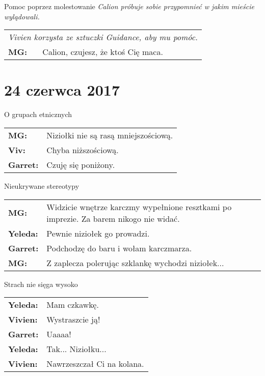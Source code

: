 \documentclass[10pt,twoside,twocolumn]{book}
\begin{document}
\begin{rpg-quotebox}{Pomoc poprzez molestowanie}
   \textit{Calion próbuje sobie przypomnieć w jakim mieście wylądowali.}\\
   
   \begin{tabularx}{\columnwidth}{lX}
      \multicolumn{2}{l}{\textit{Vivien korzysta ze sztuczki Guidance, aby mu pomóc.}}\\
      
      \textbf{MG:} & Calion, czujesz, że ktoś Cię maca.\\
   \end{tabularx}
\end{rpg-quotebox}

\section*{24 czerwca 2017}

\begin{rpg-quotebox}{O grupach etnicznych}
   \begin{tabularx}{\columnwidth}{lX}
      \textbf{MG:} & Niziołki nie są rasą mniejszościową.\\
      \textbf{Viv:} & Chyba niższościową.\\
      \textbf{Garret:} & Czuję się poniżony.
   \end{tabularx}
\end{rpg-quotebox}


\begin{rpg-quotebox}{Nieukrywane stereotypy}
   \begin{tabularx}{\columnwidth}{lX}
      \textbf{MG:} & Widzicie wnętrze karczmy wypełnione resztkami po imprezie. Za barem nikogo nie widać.\\
      \textbf{Yeleda:} & Pewnie niziołek go prowadzi.\\
      \textbf{Garret:} & Podchodzę do baru i wołam karczmarza.\\
      \textbf{MG:} & Z zaplecza polerując szklankę wychodzi niziołek...\\
   \end{tabularx}
\end{rpg-quotebox}


\begin{rpg-quotebox}{Strach nie sięga wysoko}
   \begin{tabularx}{\columnwidth}{lX}
      \textbf{Yeleda:} & Mam czkawkę.\\
      \textbf{Vivien:} & Wystraszcie ją!\\
      \textbf{Garret:} & Uaaaa!\\
      \textbf{Yeleda:} & Tak... Niziołku...\\
      \textbf{Vivien:} & Nawrzeszczał Ci na kolana.\\
   \end{tabularx}
\end{rpg-quotebox}
\end{document}
